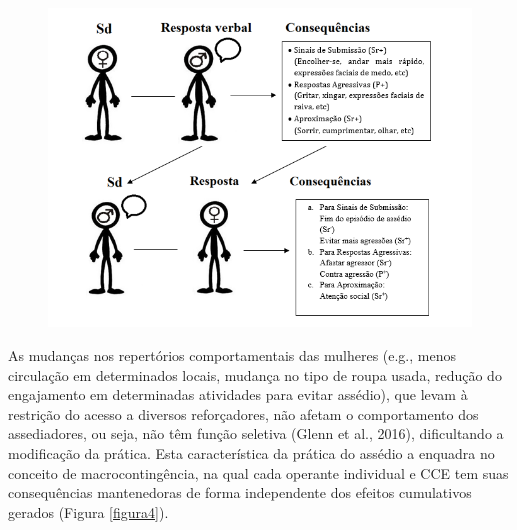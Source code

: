 \begin{figure}[h]
    \begin{center}
        \includegraphics[width=1\textwidth]{7/figura3}
        \label{figura3}
\end{center}
\end{figure}

As mudanças nos repertórios comportamentais das mulheres (e.g., menos circulação em determinados locais, mudança no tipo de roupa usada, redução do engajamento em determinadas atividades para evitar assédio), que levam à restrição do acesso a diversos reforçadores, não afetam o comportamento dos assediadores, ou seja, não têm função seletiva (Glenn et al., 2016), dificultando a modificação da prática. Esta característica da prática do assédio a enquadra no conceito de macrocontingência, na qual cada operante individual e CCE tem suas consequências mantenedoras de forma independente dos efeitos cumulativos gerados (Figura \ref{figura4}).

